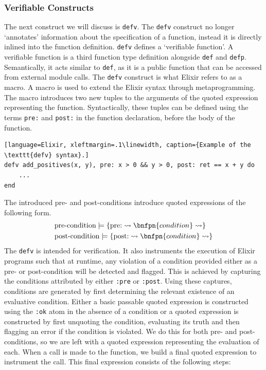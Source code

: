 \subsubsection{Verifiable Constructs}
The next construct we will discuss is \texttt{defv}. The \texttt{defv} construct no longer `annotates' information about the specification of a function, instead it is directly inlined into the function definition. \texttt{defv} defines a `verifiable function'. A verifiable function is a third function type definition alongside \texttt{def} and \texttt{defp}. Semantically, it acts similar to \texttt{def}, as it is a public function that can be accessed from external module calls. The \texttt{defv} construct is what Elixir refers to as a macro. A macro is used to extend the Elixir syntax through metaprogramming. The macro introduces two new tuples to the arguments of the quoted expression representing the function. Syntactically, these tuples can be defined using the terms \texttt{pre:} and \texttt{post:} in the function declaration, before the body of the function.
\begin{lstlisting}[language=Elixir, xleftmargin=.1\linewidth, caption={Example of the \texttt{defv} syntax}.]
defv add_positives(x, y), pre: x > 0 && y > 0, post: ret == x + y do
    ...
end
\end{lstlisting}
The introduced pre- and post-conditions introduce quoted expressions of the following form.
\[
\begin{aligned}
& \text{pre-condition} \models \{\text{pre:} \rightsquigarrow \bnfpn{condition} \rightsquigarrow \} \\
& \text{post-condition} \models \{\text{post:} \rightsquigarrow \bnfpn{condition} \rightsquigarrow \}
\end{aligned}
\]
The \texttt{defv} is intended for verification. It also instruments the execution of Elixir programs such that at runtime, any violation of a condition provided either as a pre- or post-condition will be detected and flagged. This is achieved by capturing the conditions attributed by either \texttt{:pre} or \texttt{:post}. Using these captures, conditions are generated by first determining the relevant existence of an evaluative condition. Either a basic passable quoted expression is constructed using the \texttt{:ok} atom in the absence of a condition or a quoted expression is constructed by first unquoting the condition, evaluating its truth and then flagging an error if the condition is violated. We do this for both pre- and post-conditions, so we are left with a quoted expression representing the evaluation of each. When a call is made to the function, we build a final quoted expression to instrument the call. This final expression consists of the following steps:
